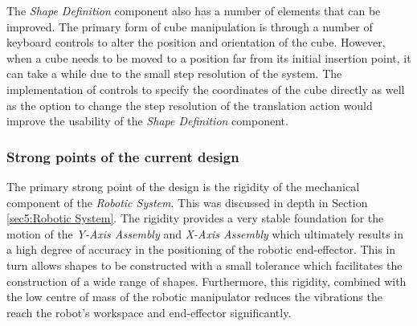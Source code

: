 The \textit{Shape Definition} component also has a number of elements that can be improved. The primary form of cube manipulation is through a number of keyboard controls to alter the position and orientation of the cube. However, when a cube needs to be moved to a position far from its initial insertion point, it can take a while due to the small step resolution of the system. The implementation of controls to specify the coordinates of the cube directly as well as the option to change the step resolution of the translation action would improve the usability of the \textit{Shape Definition} component.

%
%

\subsubsection{Strong points of the current design}


The primary strong point of the design is the rigidity of the mechanical component of the \textit{Robotic System}. This was discussed in depth in Section \ref{sec5:Robotic System}. The rigidity provides a very stable foundation for the motion of the \textit{Y-Axis Assembly} and \textit{X-Axis Assembly} which ultimately results in a high degree of accuracy in the positioning of the robotic end-effector. This in turn allows shapes to be constructed with a small tolerance which facilitates the construction of a wide range of shapes. Furthermore, this rigidity, combined with the low centre of mass of the robotic manipulator reduces the vibrations the reach the robot's workspace and end-effector significantly.

